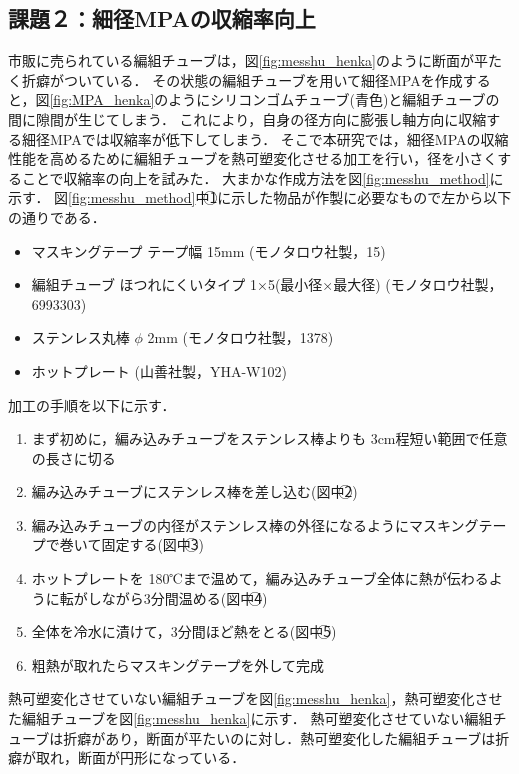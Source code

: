 \subsection{課題２：細径MPAの収縮率向上}
市販に売られている編組チューブは，図\ref{fig:messhu_henka}のように断面が平たく折癖がついている．
その状態の編組チューブを用いて細径MPAを作成すると，図\ref{fig:MPA_henka}のようにシリコンゴムチューブ(青色)と編組チューブの間に隙間が生じてしまう．
これにより，自身の径方向に膨張し軸方向に収縮する細径MPAでは収縮率が低下してしまう．
そこで本研究では，細径MPAの収縮性能を高めるために編組チューブを熱可塑変化させる加工を行い，径を小さくすることで収縮率の向上を試みた．
大まかな作成方法を図\ref{fig:messhu_method}に示す．
図\ref{fig:messhu_method}中\textcircled{\scriptsize 1}に示した物品が作製に必要なもので左から以下の通りである．
%
\begin{itemize}
  \item マスキングテープ テープ幅 15mm (モノタロウ社製，15)
  \item 編組チューブ ほつれにくいタイプ 1×5(最小径×最大径) (モノタロウ社製，6993303)
  \item ステンレス丸棒 $\phi$ 2mm (モノタロウ社製，1378)
  \item ホットプレート (山善社製，YHA-W102)
\end{itemize}
%
加工の手順を以下に示す．
\vspace{3mm}
\begin{enumerate}
  \item まず初めに，編み込みチューブをステンレス棒よりも 3cm程短い範囲で任意の長さに切る
  \item 編み込みチューブにステンレス棒を差し込む(図中\textcircled{\scriptsize 2})
  \item 編み込みチューブの内径がステンレス棒の外径になるようにマスキングテープで巻いて固定する(図中\textcircled{\scriptsize 3})
  \item ホットプレートを 180℃まで温めて，編み込みチューブ全体に熱が伝わるように転がしながら3分間温める(図中\textcircled{\scriptsize 4})
  \item 全体を冷水に漬けて，3分間ほど熱をとる(図中\textcircled{\scriptsize 5})
  \item 粗熱が取れたらマスキングテープを外して完成
\end{enumerate}
熱可塑変化させていない編組チューブを図\ref{fig:messhu_henka}，熱可塑変化させた編組チューブを図\ref{fig:messhu_henka}に示す．
熱可塑変化させていない編組チューブは折癖があり，断面が平たいのに対し．熱可塑変化した編組チューブは折癖が取れ，断面が円形になっている．
